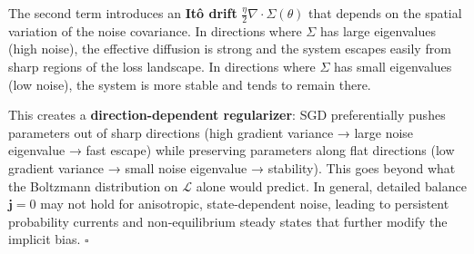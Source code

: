 \documentclass[
]{article}
\begin{document}
The second term introduces an \textbf{Itô drift}
\(\frac{\eta}{2}\nabla\cdot\Sigma(\theta)\) that depends on the spatial
variation of the noise covariance. In directions where \(\Sigma\) has
large eigenvalues (high noise), the effective diffusion is strong and
the system escapes easily from sharp regions of the loss landscape. In
directions where \(\Sigma\) has small eigenvalues (low noise), the
system is more stable and tends to remain there.

This creates a \textbf{direction-dependent regularizer}: SGD
preferentially pushes parameters out of sharp directions (high gradient
variance → large noise eigenvalue → fast escape) while preserving
parameters along flat directions (low gradient variance → small noise
eigenvalue → stability). This goes beyond what the Boltzmann
distribution on \(\mathcal{L}\) alone would predict. In general,
detailed balance \(\mathbf{j} = 0\) may not hold for anisotropic,
state-dependent noise, leading to persistent probability currents and
non-equilibrium steady states that further modify the implicit bias.
\(\square\)
\end{document}
